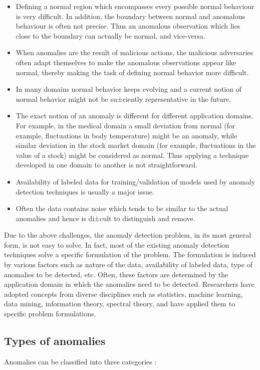 \begin{itemize}
\item Defining a normal region which encompasses every possible normal behaviour 
is very difficult. In addition, the boundary between normal and anomalous 
behaviour is often not precise. Thus an anomalous observation which lies close
to the boundary can actually be normal, and vice-versa.
\item When anomalies are the result of malicious actions, the malicious 
adversaries often adapt themselves to make the anomalous observations appear 
like normal, thereby making the task of defining normal behavior more difficult.
\item In many domains normal behavior keeps evolving and a current notion of
normal behavior might not be su±ciently representative in the future.
\item The exact notion of an anomaly is different for different application 
domains. For example, in the medical domain a small deviation from normal (for
example, fluctuations in body temperature) might be an anomaly, while similar 
deviation in the stock market domain (for example, fluctuations in the value of 
a stock) might be considered as normal. Thus applying a technique developed in 
one domain to another is not straightforward.
\item Availability of labeled data for training/validation of models used by 
anomaly detection techniques is usually a major issue.
\item Often the data contains noise which tends to be similar to the actual 
anomalies and hence is di±cult to distinguish and remove.
\end{itemize}

Due to the above challenges, the anomaly detection problem, in its most general
form, is not easy to solve. In fact, most of the existing anomaly detection 
techniques solve a specific formulation of the problem. The formulation is 
induced by various factors such as nature of the data, availability of labeled 
data, type of anomalies to be detected, etc. Often, these factors are determined
by the application domain in which the anomalies need to be detected. 
Researchers have adopted concepts from diverse disciplines such as statistics, 
machine learning, data mining, information theory, spectral theory, and have 
applied them to specific problem formulations.

\subsection{Types of anomalies}
\label{sec:anomalyDetection:typesOfAnomalies}
Anomalies can be classified into three categories \cite{CHANDOLA07}:

